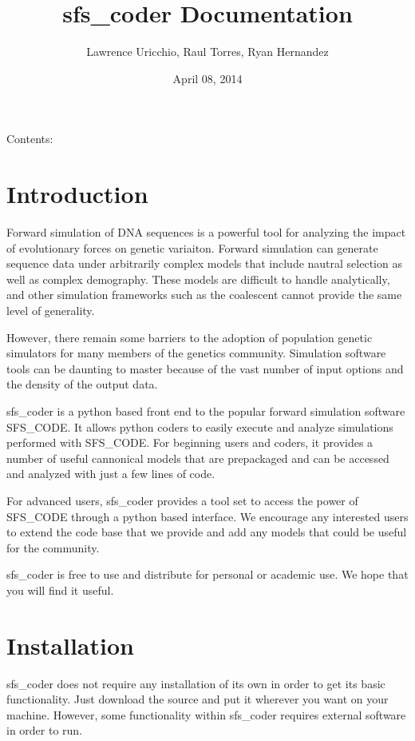 \documentclass[letterpaper,10pt,english]{sphinxmanual}
\title{sfs\_coder Documentation}
\date{April 08, 2014}
\author{Lawrence Uricchio, Raul Torres, Ryan Hernandez}
\begin{document}
\maketitle
\tableofcontents
{}\label{index::doc}


Contents:


\chapter{Introduction}
\label{rstfiles/intro:introduction}\label{rstfiles/intro::doc}\label{rstfiles/intro:sfs-coder-documentation}
Forward simulation of DNA sequences is a powerful tool for analyzing the impact
of evolutionary forces on genetic variaiton.  Forward simulation can generate
sequence data under arbitrarily complex models that include nautral selection
as well as complex demography.  These models are difficult to handle
analytically, and other simulation frameworks such as the coalescent cannot
provide the same level of generality.

However, there remain some barriers to the adoption of population genetic
simulators for many members of the genetics community. Simulation software
tools can be daunting to master because of the vast number of input options
and the density of the output data.

sfs\_coder is a python based front end to the popular forward simulation
software SFS\_CODE.  It allows python coders to easily execute and analyze
simulations performed with SFS\_CODE.  For beginning users and coders, it
provides a number of useful cannonical models that are prepackaged and can be
accessed and analyzed with just a few lines of code.

For advanced users, sfs\_coder provides a tool set to access the power of
SFS\_CODE through a python based interface.  We encourage any interested users
to extend the code base that we provide and add any models that could be
useful for the community.

sfs\_coder is free to use and distribute for personal or academic use.
We hope that you will find it useful.


\chapter{Installation}
\label{rstfiles/install:installation}\label{rstfiles/install::doc}
sfs\_coder does not require any installation of its own in order
to get its basic functionality.  Just download the source and put it
wherever you want on your machine. However, some functionality within
sfs\_coder requires external software in order to run.
\end{document}
